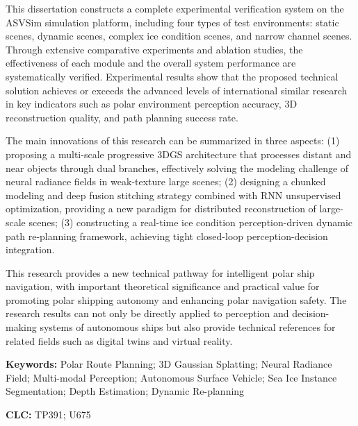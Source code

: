 \documentclass[12pt,a4paper]{ctexbook}
\begin{document}
This dissertation constructs a complete experimental verification system on the ASVSim simulation platform, including four types of test environments: static scenes, dynamic scenes, complex ice condition scenes, and narrow channel scenes. Through extensive comparative experiments and ablation studies, the effectiveness of each module and the overall system performance are systematically verified. Experimental results show that the proposed technical solution achieves or exceeds the advanced levels of international similar research in key indicators such as polar environment perception accuracy, 3D reconstruction quality, and path planning success rate.

The main innovations of this research can be summarized in three aspects: (1) proposing a multi-scale progressive 3DGS architecture that processes distant and near objects through dual branches, effectively solving the modeling challenge of neural radiance fields in weak-texture large scenes; (2) designing a chunked modeling and deep fusion stitching strategy combined with RNN unsupervised optimization, providing a new paradigm for distributed reconstruction of large-scale scenes; (3) constructing a real-time ice condition perception-driven dynamic path re-planning framework, achieving tight closed-loop perception-decision integration.

This research provides a new technical pathway for intelligent polar ship navigation, with important theoretical significance and practical value for promoting polar shipping autonomy and enhancing polar navigation safety. The research results can not only be directly applied to perception and decision-making systems of autonomous ships but also provide technical references for related fields such as digital twins and virtual reality.

\vspace{1.5em}
\noindent\textbf{Keywords:} Polar Route Planning; 3D Gaussian Splatting; Neural Radiance Field; Multi-modal Perception; Autonomous Surface Vehicle; Sea Ice Instance Segmentation; Depth Estimation; Dynamic Re-planning

\vspace{1em}
\noindent\textbf{CLC:} TP391; U675

\newpage

\tableofcontents

\listoffigures
{}
\end{document}
